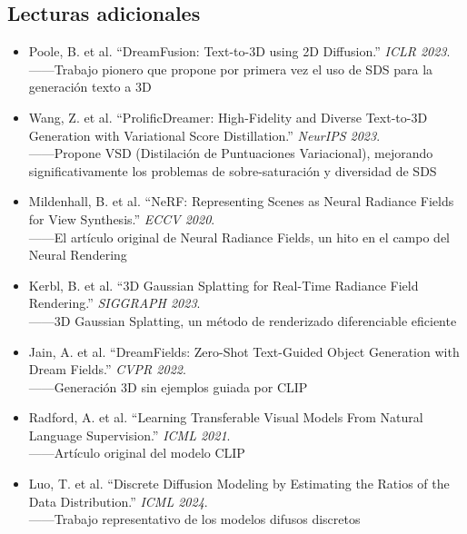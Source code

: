 \documentclass[a4paper]{article}
\begin{document}
\subsection{Lecturas adicionales}

\begin{itemize}
    \item Poole, B. et al. ``DreamFusion: Text-to-3D using 2D Diffusion.'' \textit{ICLR 2023}. \\
    ——Trabajo pionero que propone por primera vez el uso de SDS para la generación texto a 3D

    \item Wang, Z. et al. ``ProlificDreamer: High-Fidelity and Diverse Text-to-3D Generation with Variational Score Distillation.'' \textit{NeurIPS 2023}. \\
    ——Propone VSD (Distilación de Puntuaciones Variacional), mejorando significativamente los problemas de sobre-saturación y diversidad de SDS

    \item Mildenhall, B. et al. ``NeRF: Representing Scenes as Neural Radiance Fields for View Synthesis.'' \textit{ECCV 2020}. \\
    ——El artículo original de Neural Radiance Fields, un hito en el campo del Neural Rendering

    \item Kerbl, B. et al. ``3D Gaussian Splatting for Real-Time Radiance Field Rendering.'' \textit{SIGGRAPH 2023}. \\
    ——3D Gaussian Splatting, un método de renderizado diferenciable eficiente

    \item Jain, A. et al. ``DreamFields: Zero-Shot Text-Guided Object Generation with Dream Fields.'' \textit{CVPR 2022}. \\
    ——Generación 3D sin ejemplos guiada por CLIP

    \item Radford, A. et al. ``Learning Transferable Visual Models From Natural Language Supervision.'' \textit{ICML 2021}. \\
    ——Artículo original del modelo CLIP

    \item Luo, T. et al. ``Discrete Diffusion Modeling by Estimating the Ratios of the Data Distribution.'' \textit{ICML 2024}. \\
    ——Trabajo representativo de los modelos difusos discretos
\end{itemize}

\end{document}
